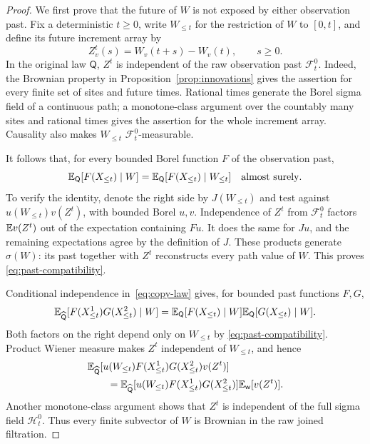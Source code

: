 \begin{proof}
We first prove that the future of $W$ is not exposed by either
observation past. Fix a deterministic $t\ge0$, write $W_{\le t}$ for
the restriction of $W$ to $[0,t]$, and define its future increment
array by
\[
 Z^t_v(s)=W_v(t+s)-W_v(t),\qquad s\ge0.
\]
In the original law $\mathsf Q$, $Z^t$ is independent of the raw
observation past $\mathcal F_t^0$. Indeed, the Brownian property in
Proposition~\ref{prop:innovations} gives the assertion for every
finite set of sites and future times. Rational times generate the
Borel sigma field of a continuous path; a monotone-class argument
over the countably many sites and rational times gives the assertion
for the whole increment array. Causality also makes $W_{\le t}$
$\mathcal F_t^0$-measurable.

It follows that, for every bounded Borel function $F$ of the
observation past,
\begin{equation}\label{eq:past-compatibility}
 \mathbb E_{\mathsf Q}[F(X_{\le t})\mid W]
   =\mathbb E_{\mathsf Q}[F(X_{\le t})\mid W_{\le t}]
   \quad\text{almost surely}.
\end{equation}
To verify the identity, denote the right side by $J(W_{\le t})$ and
test against $u(W_{\le t})v(Z^t)$, with bounded Borel $u,v$.
Independence of $Z^t$ from $\mathcal F_t^0$ factors $\mathbb E v(Z^t)$ out
of the expectation containing $F u$. It does the same for $J u$,
and the remaining expectations agree by the definition of $J$.
These products generate $\sigma(W)$: its past together with $Z^t$
reconstructs every path value of $W$. This proves
\eqref{eq:past-compatibility}.

Conditional independence in~\eqref{eq:copy-law} gives, for bounded
past functions $F,G$,
\[
 \mathbb E_{\widehat{\mathsf Q}}
   [F(X^1_{\le t})G(X^2_{\le t})\mid W]
 =\mathbb E_{\mathsf Q}[F(X_{\le t})\mid W]
  \mathbb E_{\mathsf Q}[G(X_{\le t})\mid W].
\]
Both factors on the right depend only on $W_{\le t}$ by
\eqref{eq:past-compatibility}. Product Wiener measure makes $Z^t$
independent of $W_{\le t}$, and hence
\begin{align*}
 &\mathbb E_{\widehat{\mathsf Q}}
   [u(W_{\le t})F(X^1_{\le t})G(X^2_{\le t})v(Z^t)]\\
 &\qquad=\mathbb E_{\widehat{\mathsf Q}}
   [u(W_{\le t})F(X^1_{\le t})G(X^2_{\le t})]
       \mathbb E_{\mathsf w}[v(Z^t)].
\end{align*}
Another monotone-class argument shows that $Z^t$ is independent of
the full sigma field $\mathcal H_t^0$. Thus every finite subvector
of $W$ is Brownian in the raw joined filtration.


\end{proof}

